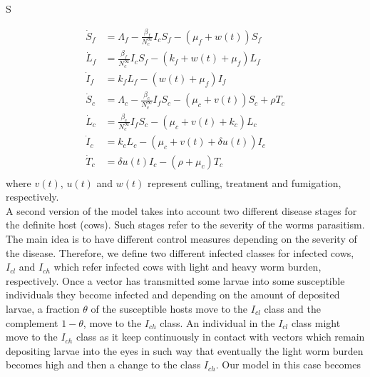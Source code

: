 S\documentclass[preprint,12pt]{elsarticle}
\begin{document}
\begin{equation}\label{Eq:SIvectorhostmodelcontrol}
\begin{aligned}
    \dot{S}_f&= 
        \Lambda_f-\frac{\beta_f}{N_c^{\infty}}I_c S_f-(\mu_f+w(t))S_f
    \\
    \dot{L}_f&= 
        \frac{\beta_f}{N_c^{\infty}} I_c S_f-
        \left(
            k_f + w(t) + \mu_f
        \right) L_f
    \\
    \dot{I}_f&= 
        k_f L_f-(w(t)+\mu_f)I_f
    \\
    \dot{S}_c&= 
        \Lambda_c-\frac{\beta_c}{N_c^{\infty}}I_f S_c-
        \left(
            \mu_c + v(t)
        \right)
        S_c + \rho T_c
    \\
    \dot{L}_c&= 
        \frac{\beta_c}{N_c^{\infty}} I_f S_c - 
        \left(
            \mu_c + v(t) + 
            k_c
        \right)L_c
    \\
    \dot{I}_c&= 
        k_c L_c - 
        (\mu_c + v(t) + \delta u(t))I_c
    \\
    \dot{T}_c&= 
        \delta u(t) I_c - 
        \left(
            \rho  + \mu_c
        \right) T_c
    \\
\end{aligned}
\end{equation}
where $v(t)$, $u(t)$ and $w(t)$ represent culling, treatment and fumigation, respectively.\\
\noindent A second version of the model takes into account two different disease stages for the definite host (cows). Such stages refer to the severity of the worms parasitism. The main idea is to have different control measures depending on the severity of the disease. Therefore, we define two 
different infected classes for infected cows, $I_{cl}$ and $I_{ch}$ which refer infected cows with light and heavy worm burden, respectively. Once a vector has transmitted some larvae into some susceptible individuals they become infected and depending on the amount of deposited larvae, a fraction $\theta$ of the susceptible hosts move to the $I_{cl}$ class and the complement $1-\theta$, move to the $I_{ch}$ class. An individual in the $I_{cl}$ class might move to the $I_{ch}$ class as it keep continuously in contact with vectors which remain depositing larvae into the eyes in such way that eventually the light worm burden becomes high and then a change to the class $I_{ch}$. Our model in this case becomes
\end{document}
